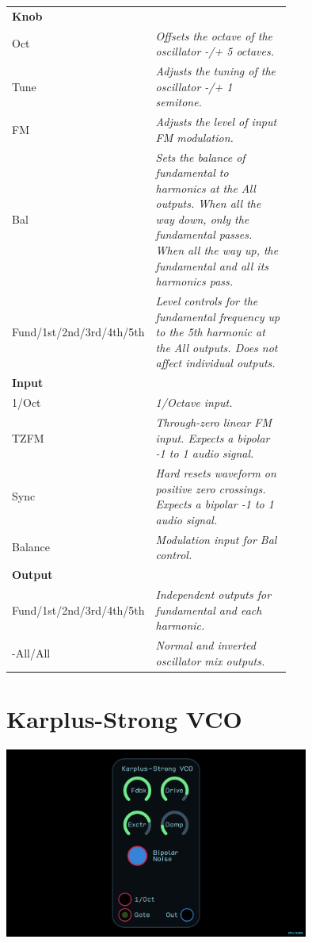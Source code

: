 \documentclass[11pt]{book}
\begin{document}
\begin{table}[ht]
\small
\sffamily
\renewcommand\arraystretch{1.5}
\centering
\begin{tabular}{l*{1}{>{\raggedright\arraybackslash}p{0.7\linewidth}}}

\toprule
\textbf{Knob} \\
Oct & \textit{Offsets the octave of the oscillator -/+ 5 octaves.} \\
Tune & \textit{Adjusts the tuning of the oscillator -/+ 1 semitone.} \\
FM & \textit{Adjusts the level of input FM modulation.} \\
Bal & \textit{Sets the balance of fundamental to harmonics at the All outputs. When all the way down, only the fundamental passes. When all the way up, the fundamental and all its harmonics pass.} \\
Fund/1st/2nd/3rd/4th/5th & \textit{Level controls for the fundamental frequency up to the 5th harmonic at the All outputs. Does not affect individual outputs.} \\

\midrule
\textbf{Input} \\
1/Oct & \textit{1/Octave input.} \\
TZFM & \textit{Through-zero linear FM input. Expects a bipolar -1 to 1 audio signal.} \\
Sync & \textit{Hard resets waveform on positive zero crossings. Expects a bipolar -1 to 1 audio signal.} \\
Balance & \textit{Modulation input for Bal control.} \\

\midrule
\textbf{Output} \\
Fund/1st/2nd/3rd/4th/5th & \textit{Independent outputs for fundamental and each harmonic.} \\
-All/All & \textit{Normal and inverted oscillator mix outputs.} \\

\bottomrule
\end{tabular}
\end{table}

\pagebreak


\section{Karplus-Strong VCO}

\begin{center}
\includegraphics[width=0.75\textwidth]{karplus-strong-vco.png}
\end{center}
\end{document}

